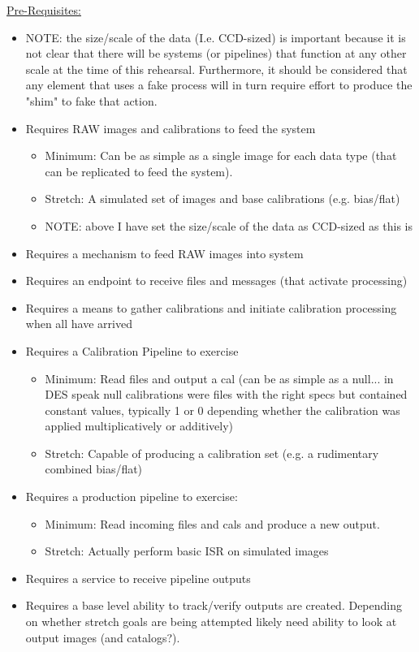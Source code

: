 \underline{Pre-Requisites:}

\begin{itemize}
\item NOTE: the size/scale of the data (I.e. CCD-sized) is important because 
it is not clear that there will be systems (or pipelines) that function at 
any other scale at the time of this rehearsal.  Furthermore, it should be 
considered that any element that uses a fake process will in turn require 
effort to produce the "shim" to fake that action.
\item Requires RAW images and calibrations to feed the system
    \begin{itemize}
    \item Minimum: Can be as simple as a single image for each data type  (that can be replicated to feed the system).
    \item Stretch:  A simulated set of images and base calibrations (e.g. bias/flat)
    \item NOTE: above I have set the size/scale of the data as CCD-sized as this is 
    \end{itemize}
\item Requires a mechanism to feed RAW images into system
\item Requires an endpoint to receive files and messages (that activate processing)
\item Requires a means to gather calibrations and initiate calibration processing when all have arrived
\item Requires a Calibration Pipeline to exercise 
    \begin{itemize}
    \item Minimum: Read files and output a cal (can be as simple as a null... in DES speak null calibrations were files with the right specs but contained constant values, typically 1 or 0 depending whether the calibration was applied multiplicatively or additively)
    \item Stretch: Capable of producing a calibration set (e.g. a rudimentary combined bias/flat)
    \end{itemize}
\item Requires a production pipeline to exercise:
    \begin{itemize}
    \item Minimum: Read incoming files and cals and produce a new output.
    \item Stretch: Actually perform basic ISR on simulated images
    \end{itemize}
\item Requires a service to receive pipeline outputs
\item Requires a base level ability to track/verify outputs are created.  Depending on whether stretch goals are being attempted likely need ability to look at output images (and catalogs?).
\end{itemize}



